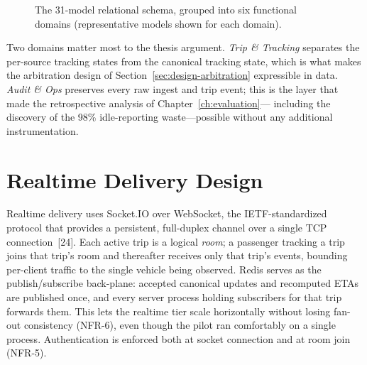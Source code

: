 \begin{figure}[H]
\centering
{}
\caption{The 31-model relational schema, grouped into six functional
domains (representative models shown for each domain).}
\label{fig:schema}
\end{figure}

Two domains matter most to the thesis argument. \emph{Trip \& Tracking}
separates the per-source tracking states from the canonical tracking
state, which is what makes the arbitration design of
Section~\ref{sec:design-arbitration} expressible in data. \emph{Audit \&
Ops} preserves every raw ingest and trip event; this is the layer that
made the retrospective analysis of Chapter~\ref{ch:evaluation}---
including the discovery of the 98\% idle-reporting waste---possible
without any additional instrumentation.

\section{Realtime Delivery Design}
\label{sec:design-realtime}
Realtime delivery uses Socket.IO over WebSocket, the IETF-standardized
protocol that provides a persistent, full-duplex channel over a single
TCP connection~[24]. Each active trip is a logical \emph{room}; a passenger tracking a trip joins that trip's room
and thereafter receives only that trip's events, bounding per-client
traffic to the single vehicle being observed. Redis serves as the
publish/subscribe back-plane: accepted canonical updates and recomputed
ETAs are published once, and every server process holding subscribers for
that trip forwards them. This lets the realtime tier scale horizontally
without losing fan-out consistency (NFR-6), even though the pilot ran
comfortably on a single process. Authentication is enforced both at
socket connection and at room join (NFR-5).

